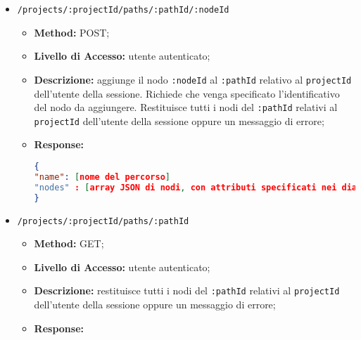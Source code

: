 \begin{itemize}
\begin{itemize}
\item \textbf{Response:}
\begin{lstlisting}[language=json,firstnumber=1]
{
"paths" : [{
"id" : [identificativo del percorso],
"name" : [nome del percorso]
}]
}
\end{lstlisting}
\end{itemize}
\item \texttt{/projects/:projectId/paths/:pathId/:nodeId}
\begin{itemize}
\item \textbf{Method:} POST;
\item \textbf{Livello di Accesso:} utente autenticato;
\item \textbf{Descrizione:} aggiunge il nodo \texttt{:nodeId} al  \texttt{:pathId} relativo al  \texttt{projectId} dell'utente della sessione. Richiede che venga specificato l'identificativo del nodo da aggiungere. Restituisce tutti i nodi del  \texttt{:pathId} relativi al  \texttt{projectId} dell'utente della sessione oppure un messaggio di errore;
\item \textbf{Response:}
\begin{lstlisting}[language=json,firstnumber=1]
{
"name": [nome del percorso]
"nodes" : [array JSON di nodi, con attributi specificati nei diagrammi delle classi]
}
\end{lstlisting}
\end{itemize}
\item \texttt{/projects/:projectId/paths/:pathId}
\begin{itemize}
\item \textbf{Method:} GET;
\item \textbf{Livello di Accesso:} utente autenticato;
\item \textbf{Descrizione:} restituisce tutti i nodi del  \texttt{:pathId} relativi al  \texttt{projectId} dell'utente della sessione oppure un messaggio di errore;
\item \textbf{Response:}
\begin{lstlisting}[language=json,firstnumber=1]

\end{lstlisting}
\end{itemize}
\end{itemize}

